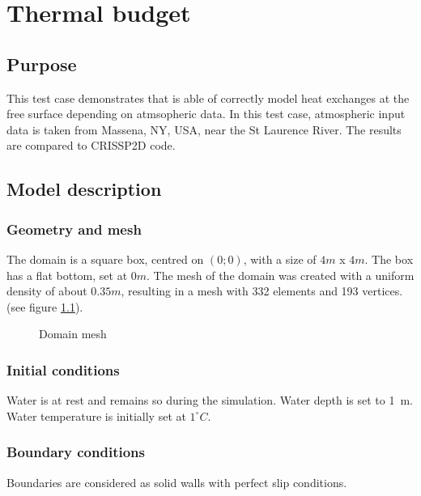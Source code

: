 \renewcommand{\labelitemi}{$\triangleright$}

\chapter{Thermal budget}
%
%
\section{Purpose}
This test case demonstrates that \khione is able of correctly model heat exchanges at the free surface depending on atmsopheric data. In this test case, atmospheric input data is taken from Massena, NY, USA, near the St Laurence River. The results are compared to CRISSP2D code.

\section{Model description}

\subsection{Geometry and mesh}
The domain is a square box, centred on $(0;0)$, with a size of $4m$ x $4m$. The box has a flat bottom, set at
$0m$. The mesh of the domain was created with a uniform density of about $0.35m$, resulting in a mesh with 332
elements and 193 vertices. (see figure \ref{fig:thermal_mesh}).

\begin{figure}[H]
    \begin{center}
    \end{center}
    \caption{Domain mesh}
    \label{fig:thermal_mesh}
\end{figure}


\subsection{Initial conditions}
Water is at rest and remains so during the simulation. Water depth is set to 1~m.
Water temperature is initially set at $1^\circ C$.

\subsection{Boundary conditions}
Boundaries are considered as solid walls with perfect slip conditions.

